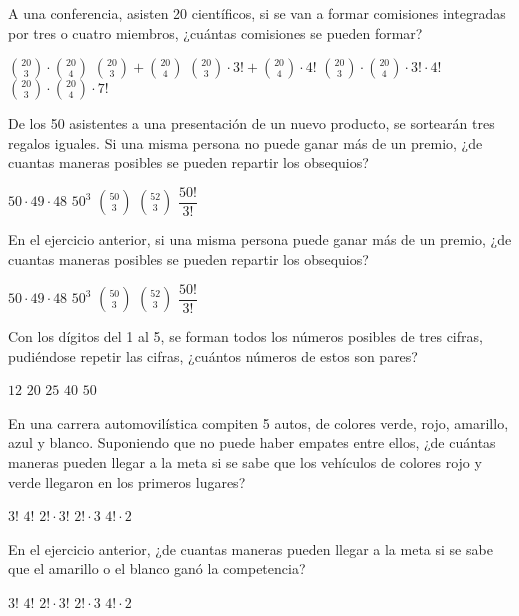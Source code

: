 \documentclass[sin nombre]{srs}
\begin{document}
\begin{preguntas}[after-item-skip=2cm]
\pregunta A una conferencia, asisten 20 científicos, si se van a formar comisiones integradas por tres o cuatro miembros, ¿cuántas comisiones se pueden formar?
\begin{vertical}
\alternativa $\binom{20}{3} \cdot \binom{20}{4}$
\alternativa $\binom{20}{3} + \binom{20}{4}$
\alternativa $\binom{20}{3} \cdot 3! + \binom{20}{4} \cdot 4!$
\alternativa $\binom{20}{3} \cdot \binom{20}{4} \cdot 3! \cdot 4!$
\alternativa $\binom{20}{3} \cdot \binom{20}{4} \cdot 7!$
\end{vertical}

\pregunta De los 50 asistentes a una presentación de un nuevo producto, se sortearán tres regalos iguales. Si una misma persona no puede ganar más de un premio, ¿de cuantas maneras posibles se pueden repartir los obsequios?
\begin{vertical}
\alternativa $50 \cdot 49 \cdot 48$
\alternativa $50^3$
\alternativa $\binom{50}{3}$
\alternativa $\binom{52}{3}$
\alternativa $\dfrac{50!}{3!}$
\end{vertical}

\pregunta En el ejercicio anterior, si una misma persona puede ganar más de un premio, ¿de cuantas maneras posibles se pueden repartir los obsequios?
\begin{vertical}
\alternativa $50 \cdot 49 \cdot 48$
\alternativa $50^3$
\alternativa $\binom{50}{3}$
\alternativa $\binom{52}{3}$
\alternativa $\dfrac{50!}{3!}$
\end{vertical}

\pregunta Con los dígitos del 1 al 5, se forman todos los números posibles de tres cifras, pudiéndose repetir las cifras, ¿cuántos números de estos son pares?
\begin{vertical}
\alternativa $12$
\alternativa $20$
\alternativa $25$
\alternativa $40$
\alternativa $50$
\end{vertical}

\pregunta En una carrera automovilística compiten 5 autos, de colores verde, rojo, amarillo, azul y blanco. Suponiendo que no puede haber empates entre ellos, ¿de cuántas maneras pueden llegar a la meta si se sabe que los vehículos de colores rojo y verde llegaron en los primeros lugares?
\begin{vertical}
\alternativa $3!$
\alternativa $4!$
\alternativa $2! \cdot 3!$
\alternativa $2! \cdot 3$
\alternativa $4! \cdot 2$
\end{vertical}

\pregunta En el ejercicio anterior, ¿de cuantas maneras pueden llegar a la meta si se sabe que el amarillo o el blanco ganó la competencia?
\begin{vertical}
\alternativa $3!$
\alternativa $4!$
\alternativa $2! \cdot 3!$
\alternativa $2! \cdot 3$
\alternativa $4! \cdot 2$
\end{vertical}


\end{preguntas}
\end{document}
